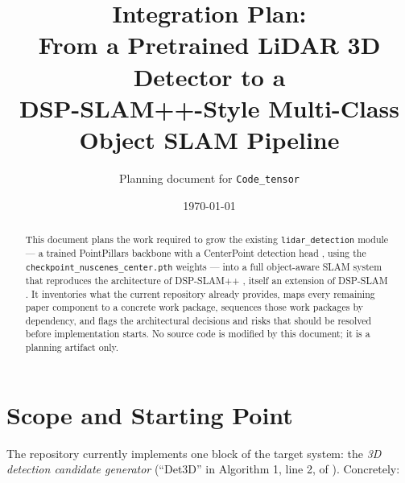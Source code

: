 \documentclass[11pt]{article}
\title{Integration Plan:\\From a Pretrained LiDAR 3D Detector to a\\DSP-SLAM++-Style Multi-Class Object SLAM Pipeline}
\author{Planning document for \texttt{Code\_tensor}}
\date{\today}
\begin{document}
\maketitle

\begin{abstract}
This document plans the work required to grow the existing \texttt{lidar\_detection} module --- a trained PointPillars backbone with a CenterPoint detection head \cite{yin2021center}, using the \texttt{checkpoint\_nuscenes\_center.pth} weights --- into a full object-aware SLAM system that reproduces the architecture of DSP-SLAM++ \cite{kourani2026dspslampp}, itself an extension of DSP-SLAM \cite{wang2021dspslam}. It inventories what the current repository already provides, maps every remaining paper component to a concrete work package, sequences those work packages by dependency, and flags the architectural decisions and risks that should be resolved before implementation starts. No source code is modified by this document; it is a planning artifact only.
\end{abstract}

\tableofcontents

\section{Scope and Starting Point}

The repository currently implements one block of the target system: the \emph{3D detection candidate generator} (``Det3D'' in Algorithm 1, line 2, of \cite{kourani2026dspslampp}). Concretely:
\end{document}
